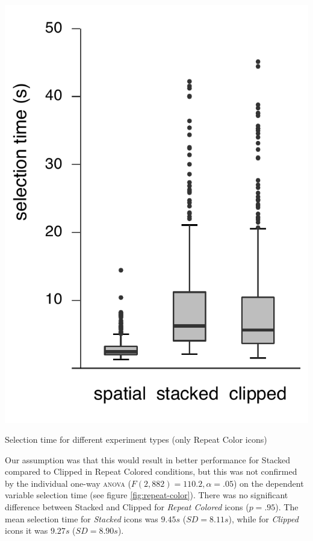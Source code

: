 \documentclass{tufte-book} %
\begin{document}
\begin{marginfigure}
  \includegraphics[width=\linewidth]{repeat-color.pdf}
  \caption{Selection time for different experiment types (only Repeat Color icons)}
  \label{fig:repeat-color}
\end{marginfigure}

Our assumption was that this would result in better performance for Stacked compared to Clipped in Repeat Colored conditions, but this was not confirmed by the individual one-way \textsc{anova} ($F(2,882) = 110.2, \alpha = .05$) on the dependent variable selection time (see figure \ref{fig:repeat-color}). There was no significant difference between Stacked and Clipped for \emph{Repeat Colored} icons ($p = .95$). The mean selection time for \emph{Stacked} icons was $9.45 s$ ($SD = 8.11 s$), while for \emph{Clipped} icons it was $9.27 s$ ($SD = 8.90 s$).
\end{document}
